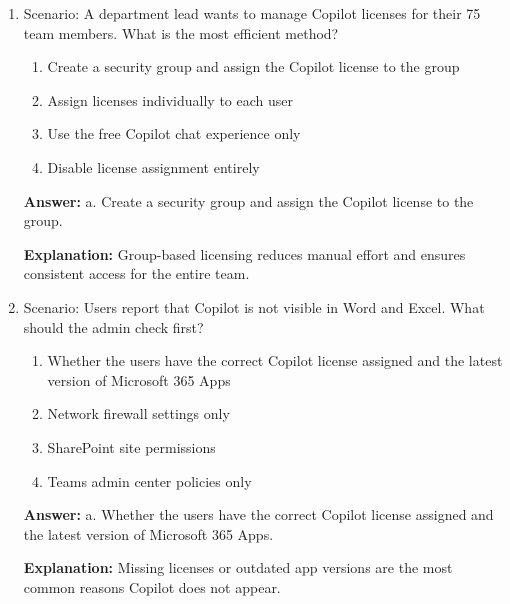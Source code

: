 \documentclass[10pt]{article}
\begin{document}
\begin{enumerate}[leftmargin=*]
\textbf{Explanation:} This role allows password resets while preventing access to sensitive billing data or tenant-wide changes.

\item Scenario: A department lead wants to manage Copilot licenses for their 75 team members. What is the most efficient method?
\begin{enumerate}[label=\alph*., leftmargin=1.5em]
\item Create a security group and assign the Copilot license to the group
\item Assign licenses individually to each user
\item Use the free Copilot chat experience only
\item Disable license assignment entirely
\end{enumerate}
\textbf{Answer:} a. Create a security group and assign the Copilot license to the group.

\textbf{Explanation:} Group-based licensing reduces manual effort and ensures consistent access for the entire team.

\item Scenario: Users report that Copilot is not visible in Word and Excel. What should the admin check first?
\begin{enumerate}[label=\alph*., leftmargin=1.5em]
\item Whether the users have the correct Copilot license assigned and the latest version of Microsoft 365 Apps
\item Network firewall settings only
\item SharePoint site permissions
\item Teams admin center policies only
\end{enumerate}
\textbf{Answer:} a. Whether the users have the correct Copilot license assigned and the latest version of Microsoft 365 Apps.

\textbf{Explanation:} Missing licenses or outdated app versions are the most common reasons Copilot does not appear.

\end{enumerate}
\clearpage
\end{document}
